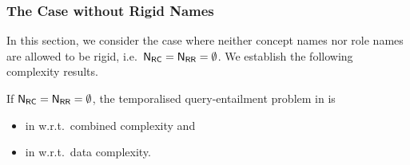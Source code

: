 \subsubsection{The Case without Rigid Names}

In this section, we consider the case where neither concept names nor role names
are allowed to be rigid, i.e.~$\mathsf{N_{RC}}=\mathsf{N_{RR}}=\emptyset$.  We establish the following
complexity results.

\begin{theorem}\label{thm:upper-bounds-no-rigid-names}
    If $\mathsf{N_{RC}}=\mathsf{N_{RR}}=\emptyset$, the temporalised query-entailment problem in \SHQ
    is
    \begin{itemize}
        \item in \ExpTime w.r.t.\ combined complexity and
        \item in \coNP w.r.t.\ data complexity.
    \end{itemize}
\end{theorem}

